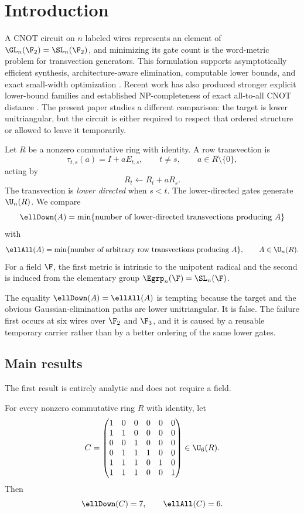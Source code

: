 \section{Introduction}

A CNOT circuit on $n$ labeled wires represents an element of $\GL_n(\F_2)=\SL_n(\F_2)$, and minimizing its gate count is the word-metric problem for transvection generators.  This formulation supports asymptotically efficient synthesis, architecture-aware elimination, computable lower bounds, and exact small-width optimization \cite{SaeediMarkov2013,PatelMarkovHayes2008,JiangEtAl2020,GoubaultEtAl2021,Bataille2022,BuFanJoo2025,ChristensenEtAl2025,WebsterEtAl2025}.  Recent work has also produced stronger explicit lower-bound families and established NP-completeness of exact all-to-all CNOT distance \cite{Jorgensen2026,GongYu2026,AcuavivaEtAl2026}.  The present paper studies a different comparison: the target is lower unitriangular, but the circuit is either required to respect that ordered structure or allowed to leave it temporarily.

Let $R$ be a nonzero commutative ring with identity.  A row transvection is
\[
\tau_{t,s}(a)=I+aE_{t,s},
\qquad t\ne s,
\qquad a\in R\setminus\{0\},
\]
acting by
\[
R_t\longleftarrow R_t+aR_s.
\]
The transvection is \emph{lower directed} when $s<t$.  The lower-directed gates generate $\U_n(R)$.  We compare
\[
\ellDown(A)
 =\min\{\text{number of lower-directed transvections producing }A\}
\]
with
\[
\ellAll(A)
 =\min\{\text{number of arbitrary row transvections producing }A\},
\qquad A\in\U_n(R).
\]
For a field $\F$, the first metric is intrinsic to the unipotent radical and the second is induced from the elementary group $\Egrp_n(\F)=\SL_n(\F)$.

The equality $\ellDown(A)=\ellAll(A)$ is tempting because the target and the obvious Gaussian-elimination paths are lower unitriangular.  It is false.  The failure first occurs at six wires over $\F_2$ and $\F_3$, and it is caused by a reusable temporary carrier rather than by a better ordering of the same lower gates.

\subsection*{Main results}

The first result is entirely analytic and does not require a field.

\begin{theorem}\label{thm:universal-atom}
For every nonzero commutative ring $R$ with identity, let
\begin{equation}\label{eq:canonical-C}
C=
\begin{pmatrix}
1&0&0&0&0&0\\
1&1&0&0&0&0\\
0&0&1&0&0&0\\
0&1&1&1&0&0\\
1&1&1&0&1&0\\
1&1&1&0&0&1
\end{pmatrix}
\in\U_6(R).
\end{equation}
Then
\[
\ellDown(C)=7,
\qquad
\ellAll(C)=6.
\]
\end{theorem}

